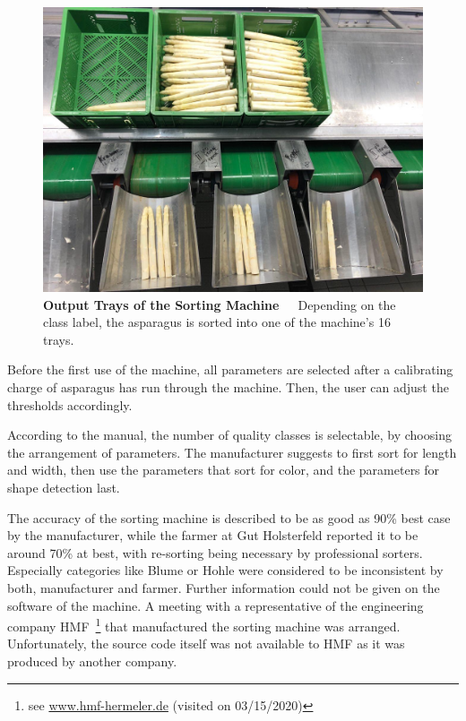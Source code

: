 \begin{figure}[!htb]
	\centering
	\includegraphics[scale=0.3]{Figures/chapter02/sorting_machine_slots.png}
	\decoRule
	\caption[Output Trays of the Sorting Machine]{\textbf{Output Trays of the Sorting Machine}~~~Depending on the class label, the asparagus is sorted into one of the machine's 16 trays.}
	\label{fig:SortingMachineSlots}
\end{figure}

Before the first use of the machine, all parameters are selected after a calibrating charge of asparagus has run through the machine. Then, the user can adjust the thresholds accordingly.

According to the manual, the number of quality classes is selectable, by choosing the arrangement of parameters. The manufacturer suggests to first sort for length and width, then use the parameters that sort for color, and the parameters for shape detection last.

The accuracy of the sorting machine is described to be as good as 90\% best case by the manufacturer, while the farmer at Gut Holsterfeld reported it to be around 70\% at best, with re-sorting being necessary by professional sorters. Especially categories like Blume or Hohle were considered to be inconsistent by both, manufacturer and farmer. Further information could not be given on the software of the machine. A meeting with a representative of the engineering company HMF~\footnote{see \url{www.hmf-hermeler.de} (visited on 03/15/2020)}  that manufactured the sorting machine was arranged. Unfortunately, the source code itself was not available to HMF as it was produced by another company. 

